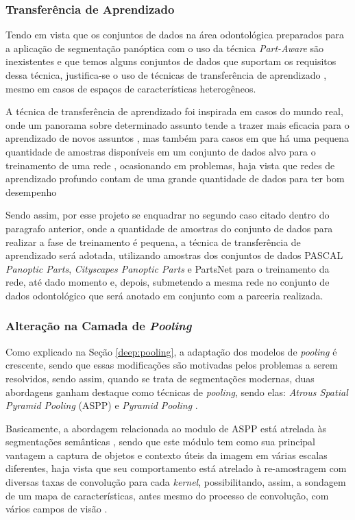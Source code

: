 \subsubsection{Transferência de Aprendizado}
\label{proposal:transf}
Tendo em vista que os conjuntos de dados na área odontológica preparados para a aplicação de segmentação panóptica com o uso da técnica \textit{Part-Aware} são inexistentes e que temos alguns conjuntos de dados que suportam os requisitos dessa técnica, justifica-se o uso de técnicas de transferência de aprendizado \cite{Weiss2016}, mesmo em casos de espaços de características heterogêneos.

A técnica de transferência de aprendizado foi inspirada em casos do mundo real, onde um panorama sobre determinado assunto tende a trazer mais eficacia para o aprendizado de novos assuntos \cite{Pan2010}, mas também para casos em que há uma pequena quantidade de amostras disponíveis em um conjunto de dados alvo para o treinamento de uma rede \cite{Weiss2016}, ocasionando em problemas, haja vista que redes de aprendizado profundo contam de uma grande quantidade de dados para ter bom desempenho \cite{Goodfellow2016}

Sendo assim, por esse projeto se enquadrar no segundo caso citado dentro do paragrafo anterior, onde a quantidade de amostras do conjunto de dados para realizar a fase de treinamento é pequena, a técnica de transferência de aprendizado será adotada, utilizando amostras dos conjuntos de dados PASCAL \textit{Panoptic Parts}, \textit{Cityscapes Panoptic Parts} e PartsNet para o treinamento da rede, até dado momento e, depois, submetendo a mesma rede no conjunto de dados odontológico que será anotado em conjunto com a parceria realizada.


\subsubsection{Alteração na Camada de \textit{Pooling}}
\label{proposal:pcapooling}
Como explicado na Seção \ref{deep:pooling}, a adaptação dos modelos de \textit{pooling} é crescente, sendo que essas modificações são motivadas pelos problemas a serem resolvidos, sendo assim, quando se trata de segmentações modernas, duas abordagens ganham destaque como técnicas de \textit{pooling}, sendo elas: \textit{Atrous Spatial Pyramid Pooling} (ASPP) \cite{Chen2018} e \textit{Pyramid Pooling} \cite{Zhao2017}.

Basicamente, a abordagem relacionada ao modulo de ASPP está atrelada às segmentações semânticas \cite{Mohan2020}, sendo que este módulo tem como sua principal vantagem a captura de objetos e contexto úteis da imagem em várias escalas diferentes, haja vista que seu comportamento está atrelado à re-amostragem com diversas taxas de convolução para cada \textit{kernel}, possibilitando, assim, a sondagem de um mapa de características, antes mesmo do processo de convolução, com vários campos de visão \cite{Chen2018}.

